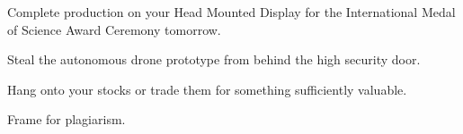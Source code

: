 \documentclass[char]{guildcamp1}
\begin{document}
\begin{itemz}[Goals]
\item Complete production on your Head Mounted Display for the International Medal of Science Award Ceremony tomorrow.
\item Steal the autonomous drone prototype from behind the high security door.
\item Hang onto your stocks or trade them for something sufficiently valuable.
\item Frame \cScientist{} for plagiarism.
\end{itemz}




\end{document}
